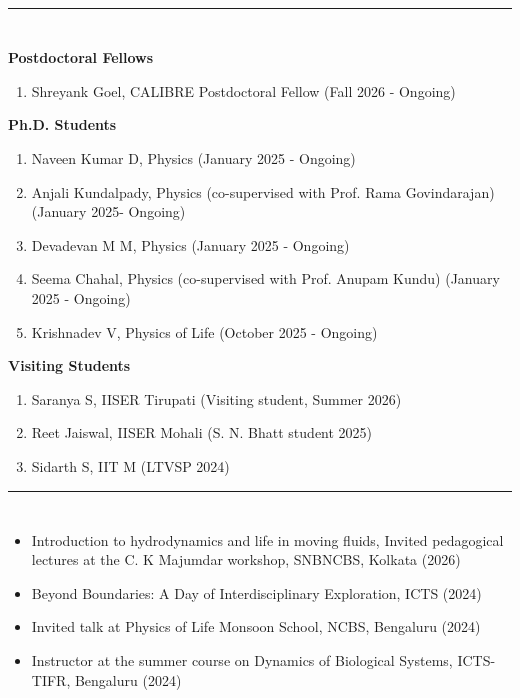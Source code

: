 \documentclass[10pt]{res} %
\begin{document}
\begin{resume}
\noindent\rule{\textwidth}{0.6pt}
\vspace*{-10mm}
\section{}
\vspace*{3mm}
\textbf{Postdoctoral Fellows}
\begin{enumerate}[itemsep=0pt]
	\item Shreyank Goel, CALIBRE Postdoctoral Fellow (Fall 2026 - Ongoing)
\end{enumerate}
\textbf{Ph.D. Students}
\begin{enumerate}[itemsep=0pt]
	\item Naveen Kumar D, Physics (January 2025 - Ongoing)
	\item Anjali Kundalpady, Physics (co-supervised with Prof. Rama Govindarajan) (January 2025- Ongoing)
	\item Devadevan M M, Physics (January 2025 - Ongoing)
	\item Seema Chahal, Physics (co-supervised with Prof. Anupam Kundu) (January 2025 - Ongoing)
	\item Krishnadev V, Physics of Life (October 2025 - Ongoing)
\end{enumerate}
\textbf{Visiting Students}
\begin{enumerate}[itemsep=0pt]

	\item Saranya S, IISER Tirupati (Visiting student, Summer 2026) 
	\item Reet Jaiswal, IISER Mohali (S. N. Bhatt student 2025)
	\item Sidarth S, IIT M (LTVSP 2024)
\end{enumerate}

\noindent\rule{\textwidth}{0.6pt}
\vspace*{-10mm}
\section{}
\enlargethispage{2\baselineskip}
\begin{itemize}
	\vspace*{5mm}
	\item Introduction to hydrodynamics and life in moving fluids, Invited pedagogical lectures at the C. K Majumdar workshop, SNBNCBS, Kolkata (2026)
	\item Beyond Boundaries: A Day of Interdisciplinary Exploration, ICTS (2024)
	\item Invited talk at Physics of Life Monsoon School, NCBS, Bengaluru (2024)
	\item Instructor at the summer course on Dynamics of Biological Systems, ICTS-TIFR, Bengaluru (2024)
\end{itemize}


\end{resume}
\end{document}
